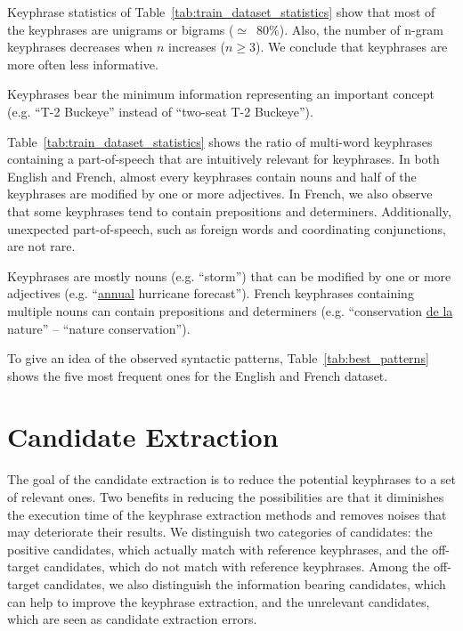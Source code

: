     Keyphrase statistics of Table~\ref{tab:train_dataset_statistics} show that
    most of the keyphrases are unigrams or bigrams ($\simeq$~$80\%$). Also, the
    number of n-gram keyphrases decreases when $n$ increases ($n\geq3$). We
    conclude that keyphrases are more often less informative.
    
    \begin{property}\label{prop:informativity}
      Keyphrases bear the minimum information representing an important concept
      (e.g. ``T-2 Buckeye'' instead of ``two-seat T-2 Buckeye'').
    \end{property}

    Table~\ref{tab:train_dataset_statistics} shows the ratio of multi-word
    keyphrases containing a part-of-speech that are intuitively relevant for
    keyphrases. In both English and French, almost every keyphrases contain
    nouns and half of the keyphrases are modified by one or more adjectives. In
    French, we also observe that some keyphrases tend to contain prepositions
    and determiners. Additionally, unexpected part-of-speech, such as foreign
    words and coordinating conjunctions, are not rare.

    \begin{property}\label{prop:noun_phrases}
      Keyphrases are mostly nouns (e.g. ``storm'') that can be modified by one
      or more adjectives (e.g. ``\underline{annual} hurricane forecast'').
      French keyphrases containing multiple nouns can contain prepositions and
      determiners (e.g. ``conservation \underline{de la} nature'' -- ``nature
      conservation'').
    \end{property}

    To give an idea of the observed syntactic patterns,
    Table~\ref{tab:best_patterns} shows the five most frequent ones for the
    English and French dataset.

\section{Candidate Extraction}
\label{sec:candidate_extraction}
  The goal of the candidate extraction is to reduce the potential keyphrases to
  a set of relevant ones. Two benefits in reducing the possibilities are that it
  diminishes the execution time of the keyphrase extraction methods and removes
  noises that may deteriorate their results. We distinguish two categories of
  candidates: the positive candidates, which actually match with reference
  keyphrases, and the off-target candidates, which do not match with reference
  keyphrases. Among the off-target candidates, we also distinguish the
  information bearing candidates, which can help to improve the keyphrase
  extraction, and the unrelevant candidates, which are seen as candidate
  extraction errors.

